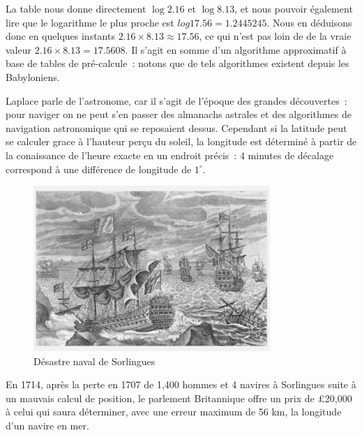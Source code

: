 La table nous donne directement $\log{2.16}$ et $\log{8.13}$, et nous pouvoir également lire que le logarithme le plus proche est $log{17.56} = 1.2445245$. Nous en déduisons donc en quelques instants $2.16\times{8.13} \approx{17.56}$, ce qui n'est pas loin de de la vraie valeur $2.16\times{8.13}={17.5608}$. Il s'agit en somme d'un algorithme approximatif à base de tables de pré-calcule~: notons que de tels algorithmes existent depuis les Babyloniens\cite{robson-math}.

Laplace parle de l'astronome, car il s'agit de l'époque des grandes découvertes~: pour naviger on ne peut s'en passer des almanachs astrales et des algorithmes de navigation astronomique qui se reposaient dessus. Cependant si la latitude peut se calculer grace à l'hauteur perçu du soleil, la longitude est déterminé à partir de la conaissance de l'heure exacte en un endroit précis~: $4$ minutes de décalage correspond à une différence de longitude de $1^{\circ}$.  

\begin{minipage}[H]{0.59\linewidth}
  \begin{figure}[H]
  \centering
  \includegraphics[width=0.8\textwidth]{../resources/illustrations/scilly1707}
  \caption{Désastre naval de Sorlingues}
  \end{figure}
\end{minipage}
\begin{minipage}[H]{0.39\linewidth}
En 1714, après la perte en 1707 de 1,400 hommes et 4 navires à Sorlingues suite à un mauvais calcul de position, le parlement Britannique offre un prix de \pounds{20,000} à celui qui saura déterminer, avec une erreur maximum de 56 km, la longitude d'un navire en mer\cite{longitude}. 
\end{minipage}

